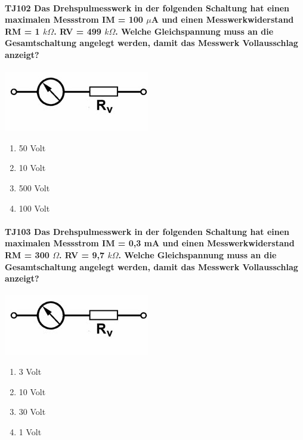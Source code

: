 \documentclass[8pt]{article}
\begin{document}
\paragraph*{TJ102 Das Drehspulmesswerk in der folgenden Schaltung hat einen maximalen Messstrom IM = 100 $\mu$A und einen Messwerkwiderstand RM = 1 $k\Omega$. RV = 499 $k\Omega$. Welche Gleichspannung muss an die Gesamtschaltung angelegt werden, damit das Messwerk Vollausschlag anzeigt?}
\begin{center}
	\begin{minipage}{\linewidth}
		\centering
		\includegraphics[scale=1.0]{pics/tj102_a.jpg}
	\end{minipage}
\end{center}
\begin{enumerate}[nolistsep,label=\Alph*]
\item 50 Volt
\item 10 Volt
\item 500 Volt
\item 100 Volt
\end{enumerate}

\paragraph*{TJ103 Das Drehspulmesswerk in der folgenden Schaltung hat einen maximalen Messstrom IM = 0,3 mA und einen Messwerkwiderstand RM = 300 $\Omega$. RV = 9,7 $k\Omega$. Welche Gleichspannung muss an die Gesamtschaltung angelegt werden, damit das Messwerk Vollausschlag anzeigt?}
\begin{center}
	\begin{minipage}{\linewidth}
		\centering
		\includegraphics[scale=1.0]{pics/tj103_a.jpg}
	\end{minipage}
\end{center}
\begin{enumerate}[nolistsep,label=\Alph*]
\item 3 Volt
\item 10 Volt
\item 30 Volt
\item 1 Volt
\end{enumerate}
\end{document}
